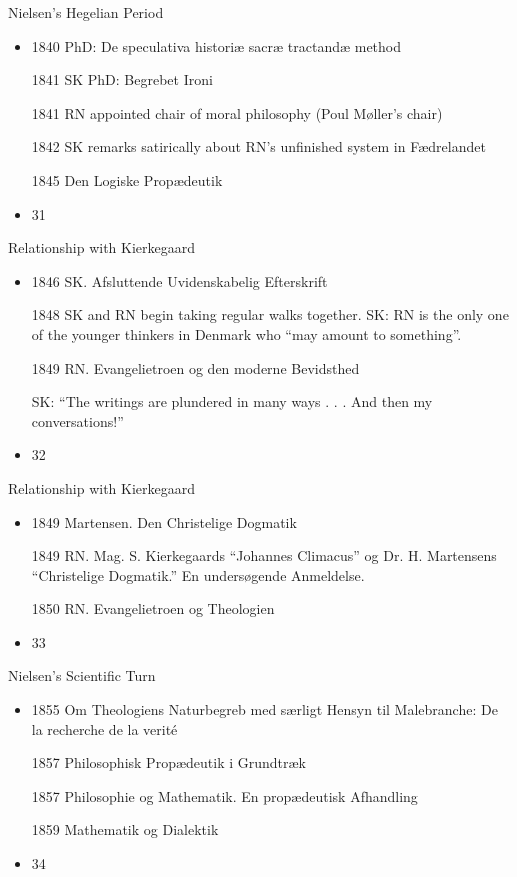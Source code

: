 \documentclass{beamer}
\begin{document}
\begin{frame}{Nielsen’s Hegelian Period}
\begin{itemize}
  \item 1840 PhD: De speculativa historiæ sacræ tractandæ method

	1841 SK PhD: Begrebet Ironi

1841 RN appointed chair of moral philosophy (Poul Møller’s chair)

	1842 SK remarks satirically about RN’s unfinished system in 		            Fædrelandet

1845 Den Logiske Propædeutik
  \item 31
\end{itemize}
\end{frame}
\begin{frame}{Relationship with Kierkegaard}
\begin{itemize}
  \item 1846 SK. Afsluttende Uvidenskabelig Efterskrift

1848 SK and RN begin taking regular walks together. SK: RN is the only one of the younger thinkers in Denmark who “may amount to something”.

1849 RN. Evangelietroen og den moderne Bevidsthed 

	SK: “The writings are plundered in many ways . . . And then 	my conversations!”
  \item 32
\end{itemize}
\end{frame}
\begin{frame}{Relationship with Kierkegaard}
\begin{itemize}
  \item 1849 Martensen. Den Christelige Dogmatik

1849 RN. Mag. S. Kierkegaards “Johannes Climacus” og Dr. H. Martensens “Christelige Dogmatik.” En undersøgende Anmeldelse.

1850 RN. Evangelietroen og Theologien
  \item 33
\end{itemize}
\end{frame}
\begin{frame}{Nielsen’s Scientific Turn}
\begin{itemize}
  \item 1855 Om Theologiens Naturbegreb med særligt Hensyn til  	Malebranche: De la recherche de la verité

1857 Philosophisk Propædeutik i Grundtræk

1857 Philosophie og Mathematik. En propædeutisk Afhandling

1859 Mathematik og Dialektik
  \item 34
\end{itemize}
\end{frame}
\end{document}
